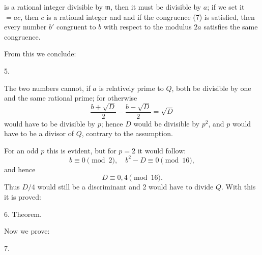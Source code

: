 
is a rational integer divisible by $\mathfrak{m}$, then it must be divisible by $a$; if we set it $= ac$, then $c$ is a rational integer and
and if the congruence (7) is satisfied, then every number $b'$ congruent to $b$ with respect to the modulus $2a$ satisfies the same congruence.

From this we conclude:

5. 

The two numbers
cannot, if $a$ is relatively prime to $Q$, both be divisible by one and the same rational prime; for otherwise
\[ \frac{b + \sqrt{D}}{2} - \frac{b - \sqrt{D}}{2} = \sqrt{D} \]
would have to be divisible by $p$; hence $D$ would be divisible by $p^2$, and $p$ would have to be a divisor of $Q$, contrary to the assumption.

For an odd $p$ this is evident, but for $p = 2$ it would follow:
\[ b \equiv 0 \pmod{2}, \quad b^2 - D \equiv 0 \pmod{16}, \]
and hence
\[ D \equiv 0, 4 \pmod{16}. \]
Thus $D/4$ would still be a discriminant and 2 would have to divide $Q$. With this it is proved:

6. Theorem. 

Now we prove:

7. 
